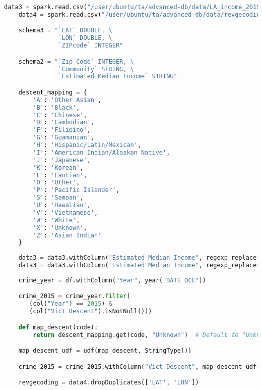 \documentclass{article}
\begin{document}
\begin{lstlisting}[language = Python]
    data3 = spark.read.csv("/user/ubuntu/ta/advanced-db/data/LA_income_2015.csv", header=True, schema=schema2)
    data4 = spark.read.csv("/user/ubuntu/ta/advanced-db/data/revgecoding.csv", header=True, schema=schema3)

    schema3 = "`LAT` DOUBLE, \
               `LON` DOUBLE, \
               `ZIPcode` INTEGER"

    schema2 = "`Zip Code` INTEGER, \
	           `Community` STRING, \
	           `Estimated Median Income` STRING"

    descent_mapping = {
        'A': 'Other Asian',
        'B': 'Black',
        'C': 'Chinese',
        'D': 'Cambodian',
        'F': 'Filipino',
        'G': 'Guamanian',
        'H': 'Hispanic/Latin/Mexican',
        'I': 'American Indian/Alaskan Native',
        'J': 'Japanese',
        'K': 'Korean',
        'L': 'Laotian',
        'O': 'Other',
        'P': 'Pacific Islander',
        'S': 'Samoan',
        'U': 'Hawaiian',
        'V': 'Vietnamese',
        'W': 'White',
        'X': 'Unknown',
        'Z': 'Asian Indian'
    }
    
    data3 = data3.withColumn("Estimated Median Income", regexp_replace(col("Estimated Median Income"), "\$", ""))
    data3 = data3.withColumn("Estimated Median Income", regexp_replace(col("Estimated Median Income"), ",", "").cast("float"))
     
    crime_year = df.withColumn("Year", year("DATE OCC"))

    crime_2015 = crime_year.filter(
       (col("Year") == 2015) & 
       (col("Vict Descent").isNotNull()))

    def map_descent(code):
        return descent_mapping.get(code, "Unknown")  # Default to "Unknown" if code not found

    map_descent_udf = udf(map_descent, StringType())

    crime_2015 = crime_2015.withColumn("Vict Descent", map_descent_udf(crime_2015["Vict Descent"]))

    revgecoding = data4.dropDuplicates(['LAT', 'LON'])
\end{lstlisting}
\end{document}
